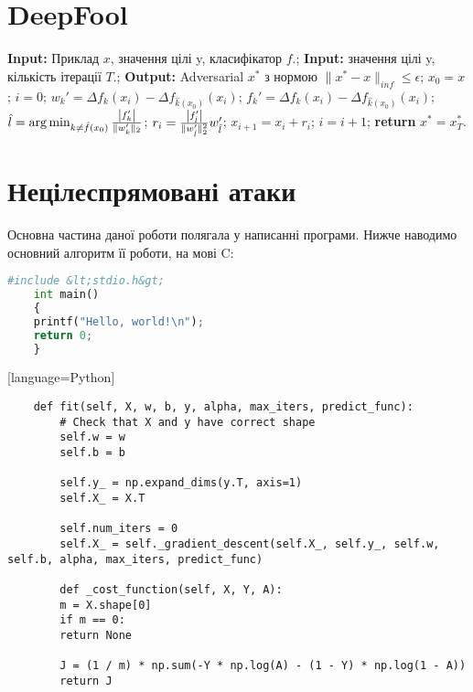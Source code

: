 \documentclass[a4paper,14pt]{extreport}
\renewcommand{\algorithmicrequire}{\textbf{Input: }}
\renewcommand{\algorithmicensure}{\textbf{Output: }}
\newcommand{\algorithmreturn}{\textbf{return }}
\begin{document}
	\section{DeepFool}
	\begin{algorithm}
		\caption{$DeepFool$}
		\begin{algorithmic}[1]
			\State \algorithmicrequire{Приклад $x$, значення цілі y, класифікатор $f$.};
			\State \algorithmicrequire{значення цілі y, кількість ітерації $T$.};
			\State \algorithmicensure{ Adversarial $x^{*}$ з нормою $\|x^{*} - x\|_{inf} \leq \epsilon $};
			\State $x_0 = x$; $i = 0$; 
					\State $ w_{k}' = \Delta f_k(x_i) - \Delta f_{\hat{k}(x_0)} (x_i)$;
					\State $ f_{k}' = \Delta f_k(x_i) - \Delta f_{\hat{k}(x_0)} (x_i)$;
				\EndFor
				\State $\hat{l} = \arg \min_{k \neq \hat{f}(x_0)} \frac{\abs{f_{k}'}}{\|w_{k}'\|_2}$;
				\State $r_i = \frac{\abs{f_{\hat{l}}'}}{\|w_{\hat{l}}'\|_{2}^{2}} w_{\hat{l}}'$;
				\State $x_{i+1} = x_i + r_i$;
				\State $i = i + 1$;
			\EndWhile
			\State \algorithmreturn{$x^{*} = x^{*}_{T}$}.
		\end{algorithmic}
	\end{algorithm}
	
	\section{Нецілеспрямовані атаки} 
	Основна частина даної роботи полягала у написанні програми. Нижче наводимо основний алгоритм її роботи, на мові C:
	
	\begin{lstlisting}[language=Python]
	#include &lt;stdio.h&gt;
	int main() 
	{ 
	printf("Hello, world!\n"); 
	return 0; 
	} 
	\end{lstlisting}[language=Python]

	\lstset{language=Python}
	\begin{lstlisting}
	def fit(self, X, w, b, y, alpha, max_iters, predict_func):
		# Check that X and y have correct shape
		self.w = w
		self.b = b
		
		self.y_ = np.expand_dims(y.T, axis=1)
		self.X_ = X.T
		
		self.num_iters = 0
		self.X_ = self._gradient_descent(self.X_, self.y_, self.w, self.b, alpha, max_iters, predict_func)
		
		def _cost_function(self, X, Y, A):
		m = X.shape[0]
		if m == 0:
		return None
		
		J = (1 / m) * np.sum(-Y * np.log(A) - (1 - Y) * np.log(1 - A))
		return J
	\end{lstlisting}
	
\end{document}
